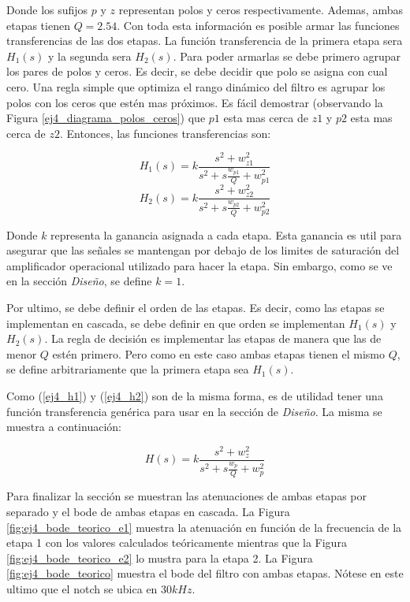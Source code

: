 Donde los sufijos $p$ y $z$ representan polos y ceros respectivamente. Ademas, ambas etapas tienen $Q = 2.54$. Con toda esta información es posible armar las funciones transferencias de las dos etapas. La función transferencia de la primera etapa sera $H_1(s)$ y la segunda sera $H_2(s)$. Para poder armarlas se debe primero agrupar los pares de polos y ceros. Es decir, se debe decidir que polo se asigna con cual cero. Una regla simple que optimiza el rango dinámico del filtro es agrupar los polos con los ceros que estén mas próximos. Es fácil demostrar (observando la 
Figura \ref{ej4_diagrama_polos_ceros}) que $p1$ esta mas cerca de  $z1$ y $p2$ esta mas cerca de $z2$. Entonces, las funciones transferencias son:

\begin{equation} H_1(s) = k\frac{s^2 + w^2_{z1}}{s^2 + s\frac{w_{p1}}{Q} + w^2_{p1}} \label{ej4_h1}\end{equation}
\begin{equation} H_2(s) = k\frac{s^2 + w^2_{z2}}{s^2 + s\frac{w_{p2}}{Q} + w^2_{p2}} \label{ej4_h2}\end{equation}

Donde $k$ representa la ganancia asignada a cada etapa. Esta ganancia es util para asegurar que las señales se mantengan por debajo de los limites de saturación del amplificador operacional utilizado para hacer la etapa. Sin embargo, como se ve en la sección \textit{Diseño}, se define $k=1$. 

Por ultimo, se debe definir el orden de las etapas. Es decir, como las etapas se implementan en cascada, se debe definir en que orden se implementan $H_1(s)$ y $H_2(s)$. La regla de decisión es implementar las etapas de manera que las de menor $Q$ estén primero. Pero como en este caso ambas etapas tienen el mismo $Q$, se define arbitrariamente que la primera etapa sea $H_1(s)$.


Como (\ref{ej4_h1}) y (\ref{ej4_h2}) son de la misma forma, es de utilidad tener una función transferencia genérica  para usar en la sección de \textit{Diseño}. La misma se muestra a continuación:

\begin{equation} H(s) = k \frac{s^2 + w_z^2}{s^2 + s\frac{w_p}{Q} + w^2_p} \label{ej4_transferencia_notch}\end{equation}


Para finalizar la sección se muestran las atenuaciones de ambas etapas por separado y el bode de ambas etapas en cascada. La Figura \ref{fig:ej4_bode_teorico_e1} muestra la atenuación en función de la frecuencia de la etapa 1 con los valores calculados teóricamente mientras que la Figura \ref{fig:ej4_bode_teorico_e2} lo mustra para la etapa 2. La Figura \ref{fig:ej4_bode_teorico} muestra el bode del filtro con ambas etapas. Nótese en este ultimo que el notch se ubica en $30kHz$.

